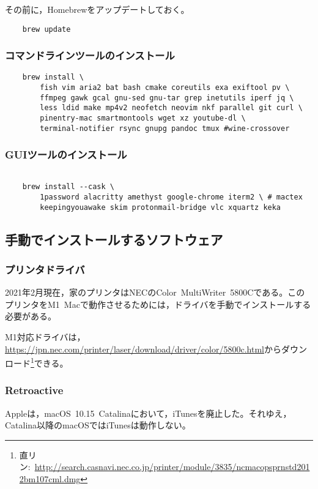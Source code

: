 \documentclass[b5j,titlepage]{ltjsarticle}
\begin{document}
			その前に，Homebrewをアップデートしておく。
				\begin{lstlisting}
	brew update
				\end{lstlisting}

			\subsubsection{コマンドラインツールのインストール}
				\begin{lstlisting}
	brew install \ 
		fish vim aria2 bat bash cmake coreutils exa exiftool pv \ 
		ffmpeg gawk gcal gnu-sed gnu-tar grep inetutils iperf jq \ 
		less ldid make mp4v2 neofetch neovim nkf parallel git curl \ 
		pinentry-mac smartmontools wget xz youtube-dl \ 
		terminal-notifier rsync gnupg pandoc tmux #wine-crossover
				\end{lstlisting}

			\subsubsection{GUIツールのインストール}
				\begin{lstlisting}

	brew install --cask \ 
		1password alacritty amethyst google-chrome iterm2 \ # mactex 
		keepingyouawake skim protonmail-bridge vlc xquartz keka

\end{lstlisting}

		\subsection{手動でインストールするソフトウェア}
			\subsubsection{プリンタドライバ}
				2021年2月現在，家のプリンタはNECのColor\ MultiWriter\ 5800Cである。このプリンタをM1\ Macで動作させるためには，ドライバを手動でインストールする必要がある。

				M1対応ドライバは，\protect\url{https://jpn.nec.com/printer/laser/download/driver/color/5800c.html}からダウンロード\footnote{直リン:\ \protect\url{http://search.casnavi.nec.co.jp/printer/module/3835/ncmacopsprnstd2012bm107cml.dmg}}できる。

			\subsubsection{Retroactive}
				Appleは，macOS\ 10.15\ Catalinaにおいて，iTunesを廃止した。それゆえ，Catalina以降のmacOSではiTunesは動作しない。
\end{document}
